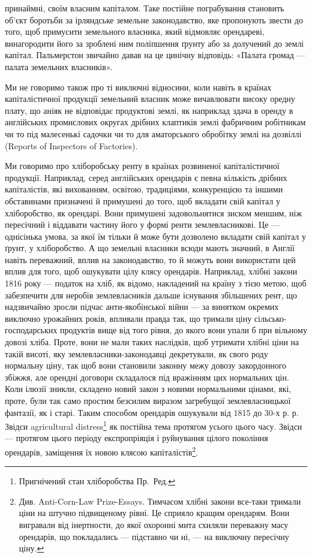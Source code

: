 \parcont{}  %
принаймні, своїм власним капіталом. Таке постійне пограбування становить об’єкт
боротьби за ірляндське земельне законодавство, яке пропонують звести до того,
щоб примусити земельного власника, який відмовляє орендареві, винагородити
його за зроблені ним поліпшення ґрунту або за долучений до землі капітал.
Пальмерстон звичайно давав на це цинічну відповідь: «Палата громад — палата
земельних власників».

Ми не говоримо також про ті виключні відносини, коли навіть в країнах
капіталістичної продукції земельний власник може вичавлювати високу оредну
плату, що аніяк не відповідає продуктові землі, як наприклад здача в оренду
в англійських промислових округах дрібних клаптиків землі фабричним робітникам
чи то під малесенькі садочки чи то для аматорського обробітку землі на
дозвіллі (Reports of Inspectors of Factories).

Ми говоримо про хліборобську ренту в країнах розвиненої капіталістичної
продукції. Наприклад, серед англійських орендарів є певна кількість дрібних
капіталістів, які вихованням, освітою, традиціями, конкуренцією та іншими обставинами
призначені й примушені до того, щоб вкладати свій капітал у
хліборобство, як орендарі. Вони примушені задовольнятися зиском меншим,
ніж пересічний і віддавати частину його у формі ренти землевласникові. Це —
однісінька умова, за якої їм тільки й може бути дозволено вкладати свій
капітал у ґрунт, у хліборобство. А що земельні власники всюди мають значний,
в Англії навіть переважний, вплив на законодавство, то й можуть вони використати
цей вплив для того, щоб ошукувати цілу клясу орендарів. Наприклад,
хлібні закони 1816 року — податок на хліб, як відомо, накладений на
країну з тією метою, щоб забезпечити для неробів землевласників дальше існування
збільшених рент, що надзвичайно зросли підчас анти-якобінської війни —
за винятком окремих виключно урожайних років, впливали правда так, що тримали
ціну сільсько-господарських продуктів вище від того рівня, до якого вони
упали б при вільному довозі хліба. Проте, вони не мали таких наслідків, щоб
утримати хлібні ціни на такій висоті, яку землевласники-законодавці декретували,
як свого роду нормальну ціну, так щоб вони становили законну межу довозу
закордонного збіжжя, але орендні договори складалося під вражінням цих
нормальних цін. Коли ілюзії зникли, складено новий закон з новими нормальними
цінами, які, проте, були так само простим безсилим виразом загребущої
землевласницької фантазії, як і старі. Таким способом орендарів ошукували
від 1815 до 30-х р. р. Звідси agricultural distress\footnote*{
Пригнічений стан хліборобства Пр.~Ред.
} як постійна тема протягом
усього цього часу. Звідси — протягом цього періоду експропріяція і руйнування
цілого покоління орендарів, заміщення їх новою клясою капіталістів\footnote{
Див. Anti-Corn-Law Prize-Essays. Тимчасом хлібні закони все-таки тримали ціни на штучно
підвищеному рівні. Це сприяло кращим орендарям. Вони вигравали від інертности, до якої охоронні
мита схиляли переважну масу орендарів, що покладались — підставно чи ні, — на виключну
пересічну ціну.
}.

